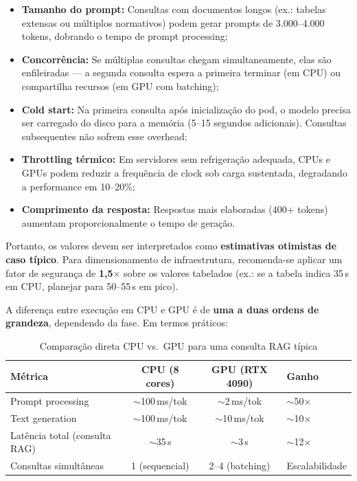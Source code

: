 \documentclass[12pt, a4paper]{article}
\begin{document}
\begin{itemize}
  \item \textbf{Tamanho do prompt:} Consultas com documentos longos (ex.: tabelas extensas ou múltiplos normativos) podem gerar prompts de 3.000--4.000 tokens, dobrando o tempo de prompt processing;
  \item \textbf{Concorrência:} Se múltiplas consultas chegam simultaneamente, elas são enfileiradas --- a segunda consulta espera a primeira terminar (em CPU) ou compartilha recursos (em GPU com batching);
  \item \textbf{Cold start:} Na primeira consulta após inicialização do pod, o modelo precisa ser carregado do disco para a memória (5--15 segundos adicionais). Consultas subsequentes não sofrem esse overhead;
  \item \textbf{Throttling térmico:} Em servidores sem refrigeração adequada, CPUs e GPUs podem reduzir a frequência de clock sob carga sustentada, degradando a performance em 10--20\%;
  \item \textbf{Comprimento da resposta:} Respostas mais elaboradas (400+ tokens) aumentam proporcionalmente o tempo de geração.
\end{itemize}

\noindent Portanto, os valores devem ser interpretados como \textbf{estimativas otimistas de caso típico}. Para dimensionamento de infraestrutura, recomenda-se aplicar um fator de segurança de \textbf{1,5$\times$} sobre os valores tabelados (ex.: se a tabela indica 35\,s em CPU, planejar para 50--55\,s em pico).

\vspace{0.3cm}

A diferença entre execução em CPU e GPU é de \textbf{uma a duas ordens de grandeza}, dependendo da fase. Em termos práticos:

\begin{table}[H]
\centering
\small
\caption{Comparação direta CPU vs.\ GPU para uma consulta RAG típica}
\label{tab:cpu_vs_gpu}
\begin{tabularx}{\textwidth}{l c c X}
\toprule
\textbf{Métrica} & \textbf{CPU (8 cores)} & \textbf{GPU (RTX 4090)} & \textbf{Ganho} \\
\midrule
Prompt processing & $\sim$100\,ms/tok & $\sim$2\,ms/tok & $\sim$50$\times$ \\
Text generation & $\sim$100\,ms/tok & $\sim$10\,ms/tok & $\sim$10$\times$ \\
Latência total (consulta RAG) & $\sim$35\,s & $\sim$3\,s & $\sim$12$\times$ \\
Consultas simultâneas & 1 (sequencial) & 2--4 (batching) & Escalabilidade \\
\bottomrule
\end{tabularx}
\end{table}
\end{document}
